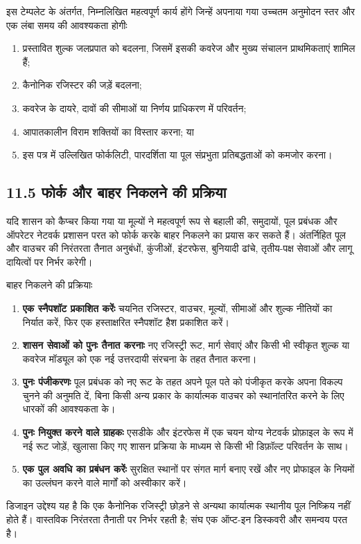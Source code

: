 \documentclass[11pt]{article}
\begin{document}
इस टेम्पलेट के अंतर्गत, निम्नलिखित महत्वपूर्ण कार्य होंगे जिन्हें अपनाया गया उच्चतम अनुमोदन स्तर और एक लंबा समय की आवश्यकता होगीः

\begin{enumerate}[leftmargin=*]
\item प्रस्तावित शुल्क जलप्रपात को बदलना, जिसमें इसकी कवरेज और मुख्य संचालन प्राथमिकताएं शामिल हैं;
\item कैनोनिक रजिस्टर की जड़ें बदलना;
\item कवरेज के दायरे, दावों की सीमाओं या निर्णय प्राधिकरण में परिवर्तन;
\item आपातकालीन विराम शक्तियों का विस्तार करना; या
\item इस पत्र में उल्लिखित फोर्कलिटी, पारदर्शिता या पूल संप्रभुता प्रतिबद्धताओं को कमजोर करना।
\end{enumerate}
\subsection*{11.5 फोर्क और बाहर निकलने की प्रक्रिया}

यदि शासन को कैप्चर किया गया या मूल्यों ने महत्वपूर्ण रूप से बहाली की, समुदायों, पूल प्रबंधक और ऑपरेटर नेटवर्क प्रशासन परत को फोर्क करके बाहर निकलने का प्रयास कर सकते हैं। अंतर्निहित पूल और वाउचर की निरंतरता तैनात अनुबंधों, कुंजीओं, इंटरफेस, बुनियादी ढांचे, तृतीय-पक्ष सेवाओं और लागू दायित्वों पर निर्भर करेगी।

बाहर निकलने की प्रक्रियाः

\begin{enumerate}[leftmargin=*]
\item \textbf{एक स्नैपशॉट प्रकाशित करेंः} चयनित रजिस्टर, वाउचर, मूल्यों, सीमाओं और शुल्क नीतियों का निर्यात करें, फिर एक हस्ताक्षरित स्नैपशॉट हैश प्रकाशित करें।
\item \textbf{शासन सेवाओं को पुनः तैनात करनाः} नए रजिस्ट्री रूट, मार्ग सेवाएं और किसी भी स्वीकृत शुल्क या कवरेज मॉड्यूल को एक नई उत्तरदायी संरचना के तहत तैनात करना।
\item \textbf{पुनः पंजीकरणः} पूल प्रबंधक को नए रूट के तहत अपने पूल पते को पंजीकृत करके अपना विकल्प चुनने की अनुमति दें, बिना किसी अन्य प्रकार के कार्यात्मक वाउचर को स्थानांतरित करने के लिए धारकों की आवश्यकता के।
\item \textbf{पुनः नियुक्त करने वाले ग्राहकः} एसडीके और इंटरफेस में एक चयन योग्य नेटवर्क प्रोफ़ाइल के रूप में नई रूट जोड़ें, खुलासा किए गए शासन प्रक्रिया के माध्यम से किसी भी डिफ़ॉल्ट परिवर्तन के साथ।
\item \textbf{एक पुल अवधि का प्रबंधन करेंः} सुरक्षित स्थानों पर संगत मार्ग बनाए रखें और नए प्रोफाइल के नियमों का उल्लंघन करने वाले मार्गों को अस्वीकार करें।
\end{enumerate}
डिजाइन उद्देश्य यह है कि एक कैनोनिक रजिस्ट्री छोड़ने से अन्यथा कार्यात्मक स्थानीय पूल निष्क्रिय नहीं होते हैं। वास्तविक निरंतरता तैनाती पर निर्भर रहती है; संघ एक ऑप्ट-इन डिस्कवरी और समन्वय परत है।
\end{document}
